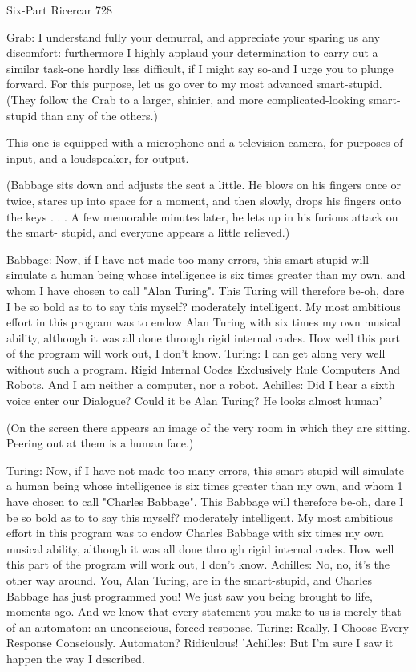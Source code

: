 Six-Part Ricercar                                                                        728

Grab: I understand fully your demurral, and appreciate your sparing us any discomfort:
  furthermore I highly applaud your determination to carry out a similar task-one hardly
  less difficult, if I might say so-and I urge you to plunge forward. For this purpose, let
  us go over to my most advanced smart-stupid.
  (They follow the Crab to a larger, shinier, and more complicated-looking smart-stupid
  than any of the others.)

This one is equipped with a microphone and a television camera, for purposes of input,
  and a loudspeaker, for output.

  (Babbage sits down and adjusts the seat a little. He blows on his fingers once or
  twice, stares up into space for a moment, and then slowly, drops his fingers onto the
  keys . . . A few memorable minutes later, he lets up in his furious attack on the smart-
  stupid, and everyone appears a little relieved.)

Babbage: Now, if I have not made too many errors, this smart-stupid will simulate a
  human being whose intelligence is six times greater than my own, and whom I have
  chosen to call "Alan Turing". This Turing will therefore be-oh, dare I be so bold as to
  to say this myself? moderately intelligent. My most ambitious effort in this program
  was to endow Alan Turing with six times my own musical ability, although it was all
  done through rigid internal codes. How well this part of the program will work out, I
  don't know.
Turing: I can get along very well without such a program. Rigid Internal Codes
  Exclusively Rule Computers And Robots. And I am neither a computer, nor a robot.
Achilles: Did I hear a sixth voice enter our Dialogue? Could it be Alan Turing? He looks
  almost human'

  (On the screen there appears an image of the very room in which they are sitting.
  Peering out at them is a human face.)

Turing: Now, if I have not made too many errors, this smart-stupid will simulate a human
   being whose intelligence is six times greater than my own, and whom 1 have chosen
   to call "Charles Babbage". This Babbage will therefore be-oh, dare I be so bold as to
   to say this myself? moderately intelligent. My most ambitious effort in this program
   was to endow Charles Babbage with six times my own musical ability, although it was
   all done through rigid internal codes. How well this part of the program will work out,
   I don't know.
Achilles: No, no, it's the other way around. You, Alan Turing, are in the smart-stupid, and
   Charles Babbage has just programmed you! We just saw you being brought to life,
   moments ago. And we know that every statement you make to us is merely that of an
   automaton: an unconscious, forced response.
Turing: Really, I Choose Every Response Consciously. Automaton? Ridiculous!
'Achilles: But I'm sure I saw it happen the way I described.




